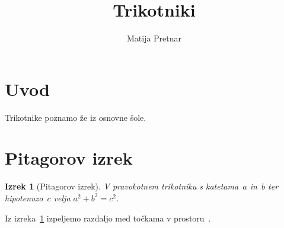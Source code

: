 \documentclass[11pt,a4paper]{article}
\title{Trikotniki}
\author{Matija Pretnar}
\date{}
\newtheorem{izrek}{Izrek}[section]
\begin{document}
\maketitle

\section{Uvod}
Trikotnike poznamo že iz osnovne šole.

\section{Pitagorov izrek}
\begin{izrek}[Pitagorov izrek]
  \label{izr:pitagora}
  V pravokotnem trikotniku s katetama~\(a\) in~\(b\) ter hipotenuzo~\(c\) velja
  \(a^2 + b^2 = c^2\).
\end{izrek}

Iz izreka~\ref{izr:pitagora} izpeljemo razdaljo med točkama v prostoru~\cite{vidav08}.



\end{document}
